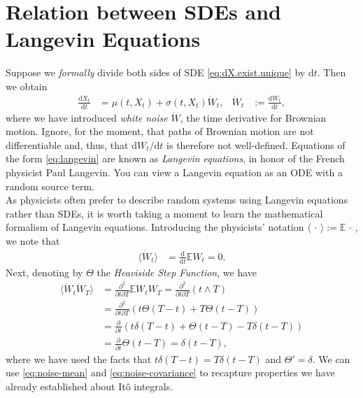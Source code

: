 \documentclass[12pt]{book}
\numberwithin{equation}{chapter}
\theoremstyle{plain}
\numberwithin{theorem}{section}
\theoremstyle{definition}
\numberwithin{exercise}{chapter}
\newcommand{\<}{\langle}
\renewcommand{\>}{\rangle}
\renewcommand{\(}{\left(}
\renewcommand{\)}{\right)}
\renewcommand{\[}{\left[}
\renewcommand{\]}{\right]}
\newcommand\Eb{\mathds{E}}
\newcommand\sig{\sigma}
\newcommand\del{\delta}
\newcommand\Wd{\dot{W}}
\renewcommand\d{\partial}
\newcommand\dd{\mathrm{d}}
\begin{document}

\section{Relation between SDEs and Langevin Equations}
\label{sec:langevin}
Suppose we \textit{formally} divide both sides of SDE \eqref{eq:dX.exist.unique} by $\dd t$.  Then we obtain
\begin{align}
\frac{\dd X_t}{\dd t}
	&=	\mu(t,X_t) + \sig(t,X_t) \Wd_t , &
\Wd_t
	&:= \frac{\dd W_t}{\dd t} , \label{eq:langevin}
\end{align}
where we have introduced \textit{white noise} $\Wd$, the time derivative for Brownian motion.  Ignore, for the moment, that paths of Brownian motion are not differentiable and, thus, that $\dd W_t / \dd t$ is therefore not well-defined.  Equations of the form \eqref{eq:langevin} are known as \textit{Langevin equations}, in honor of the French physicist Paul Langevin.  You can view a Langevin equation as an ODE with a random source term.
\\[0.5em]
As physicists often prefer to describe random systems using Langevin equations rather than SDEs, it is worth taking a moment to learn the mathematical formalism of Langevin equations.
Introducing the physicists' notation $\< \, \cdot \, \> := \Eb \, \cdot \,$, we note that
\begin{align}
\< \Wd_t \>
	&=	\frac{\dd}{\dd t} \Eb W_t 
	= 	0 . \label{eq:noise-mean}
\end{align}
Next, denoting by $\Theta$ the \textit{Heaviside Step Function}, we have
\begin{align}
\< \Wd_t \Wd_T \>
	&=	\frac{\d^2}{\d t \d T} \Eb W_t W_T
	=		\frac{\d^2}{\d t \d T} ( t \wedge T ) \\
	&=	\frac{\d^2}{\d t \d T} ( t \Theta(T-t) + T \Theta(t-T) ) \\
	&=	\frac{\d}{\d t} ( t \del(T-t) + \Theta(t-T) - T \del(t-T) ) \\
	&=	\frac{\d}{\d t} \Theta(t-T) 
	=		\del(t-T) , \label{eq:noise-covariance}
\end{align}
where we have used the facts that $t \del(T-t) = T \del(t-T)$ and $\Theta' = \del$.  We can use \eqref{eq:noise-mean} and \eqref{eq:noise-covariance} to recapture properties we have already established about It\^o integrals.
\\[0.5em]
\end{document}
